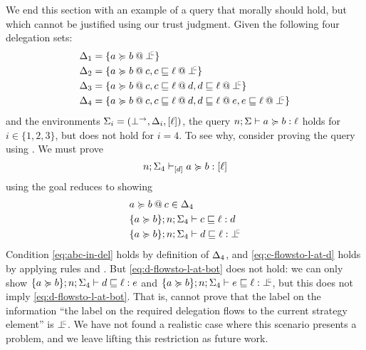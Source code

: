 We end this section with an example of a query that morally should hold, but which cannot be justified using our trust judgment. Given the following four delegation sets:
\begin{align*}
\scope_1 &= \{ \lb{\botinfoflow}{a \actsfor b} \} \\
\scope_2 &= \{ \lb{c}{a \actsfor b}, \lb{\botinfoflow}{c \flowsto \level} \} \\
\scope_3 &= \{ \lb{c}{a \actsfor b}, \lb{d}{c \flowsto \level}, \lb{\botinfoflow}{d \flowsto \level} \} \\
\scope_4 &= \{ \lb{c}{a \actsfor b}, \lb{d}{c \flowsto \level}, \lb{e}{d \flowsto \level}, \lb{\botinfoflow}{e \flowsto \level} \}
\end{align*}
and the environments $\Sigma_i = (\bot^{\rightarrow}, \Delta_i, \lbrack \ell \rbrack)$, the query $n; \Sigma \vdash a \succcurlyeq b : \ell$ holds for $i \in \{1, 2, 3\}$, but does not hold for $i = 4$. To see why, consider proving the query using . We must prove
\begin{equation*}
n; \Sigma_4 \vdash_{\lbrack d \rbrack} a \succcurlyeq b : \lbrack \ell \rbrack
\end{equation*}
using  the goal reduces to showing
\begin{align}
\label{eq:abc-in-del} &\lb{c}{a \actsfor b} \in \scope_4\\
\label{eq:c-flowsto-l-at-d} &\flowstoquery{\{a \actsfor b\}; n; \env_4}{c}{\level}{d}\\
\label{eq:d-flowsto-l-at-bot} &\flowstoquery{\{a \actsfor b\}; n; \env_4}{d}{\level}{\botinfoflow}
\end{align}
Condition \eqref{eq:abc-in-del} holds by definition of $\Delta_4$, and \eqref{eq:c-flowsto-l-at-d} holds by applying rules  and . But \eqref{eq:d-flowsto-l-at-bot} does not hold: we can only show $\{a \succcurlyeq b\}; n; \Sigma_4 \vdash d \sqsubseteq \ell : e$ and $\flowstoquery{\{a \actsfor b\}; n; \env_4}{e}{\level}{\botinfoflow}$, but this does not imply \eqref{eq:d-flowsto-l-at-bot}. That is, \lang{} cannot prove that the label on the information ``the label on the required delegation flows to the current strategy element'' is $\botinfoflow$. We have not found a realistic case where this scenario presents a problem, and we leave lifting this restriction as future work.

